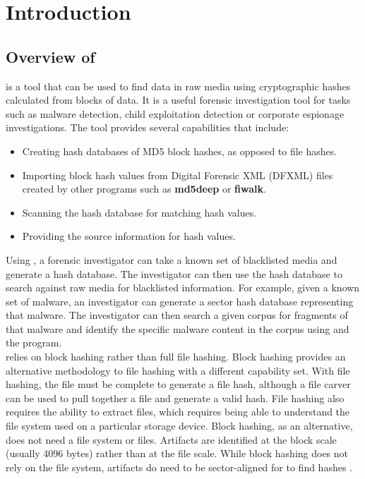 \documentclass[11pt,fleqn]{article} %
\begin{document}
\newpage


\tableofcontents
\newpage
{}





\newpage

\section{Introduction}
\subsection {Overview of \hash}
\hash is a tool that can be used to find data in raw media using cryptographic hashes calculated from blocks of data. It is a useful forensic investigation tool for tasks such as malware detection, child exploitation detection or corporate espionage investigations. The tool provides several capabilities that include:
\begin{itemize}
\item Creating hash databases of MD5 block hashes, as opposed to file hashes.
\item Importing block hash values from Digital Forensic XML (DFXML) files created by other programs such as \textbf{md5deep} or \textbf{fiwalk}.
\item Scanning the hash database for matching hash values.
\item Providing the source information for hash values. 
\end{itemize}

Using \hash, a forensic investigator can take a known set of blacklisted media and generate a hash database. The investigator can then use the hash database to search against raw media for blacklisted information. For example, given a known set of malware, an investigator can generate a sector hash database representing that malware. The investigator can then search a given corpus for fragments of that malware and identify the specific malware content in the corpus using \hash and the \bulk program. \\

\hash relies on block hashing rather than full file hashing. Block hashing provides an alternative methodology to file hashing with a different capability set. With file hashing, the file must be complete to generate a file hash, although a file carver can be used to pull together a file and generate a valid hash.  File hashing also requires the ability to extract files, which requires being able to understand the file system used on a particular storage device. Block hashing, as an alternative, does not need a file system or files. Artifacts are identified at the block scale (usually 4096 bytes) rather than at the file scale. While block hashing does not rely on the file system, artifacts do need to be sector-aligned for \hash to find hashes \cite{hashEncoding}.\\
\end{document}

